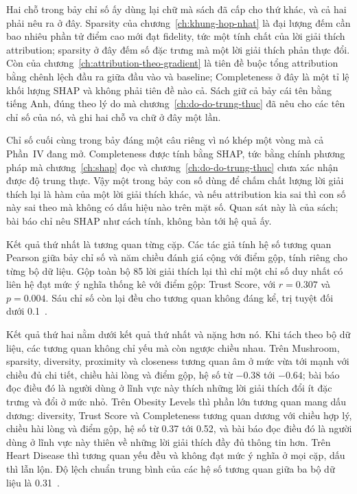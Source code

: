 Hai chỗ trong bảy chỉ số ấy dùng lại chữ mà sách đã cấp cho thứ khác, và cả
hai phải nêu ra ở đây. Sparsity của chương~\ref{ch:khung-hop-nhat} là đại
lượng đếm cần bao nhiêu phần tử điểm cao mới đạt fidelity, tức một tính chất
của lời giải thích attribution; sparsity ở đây đếm số đặc trưng mà một lời
giải thích phản thực đổi. Còn  của
chương~\ref{ch:attribution-theo-gradient} là tiên đề buộc tổng attribution
bằng chênh lệch đầu ra giữa đầu vào và baseline; Completeness ở đây là một tỉ
lệ khối lượng SHAP và không phải tiên đề nào cả. Sách giữ cả bảy cái tên bằng
tiếng Anh, đúng theo lý do mà chương~\ref{ch:do-do-trung-thuc} đã nêu cho các
tên chỉ số của nó, và ghi hai chỗ va chữ ở đây một lần.

%
Chỉ số cuối cùng trong bảy đáng một câu riêng vì nó khép một vòng mà cả
Phần~IV đang mở. Completeness được tính bằng SHAP, tức bằng chính phương pháp
mà chương~\ref{ch:shap} đọc và chương~\ref{ch:do-do-trung-thuc} chưa xác nhận
được độ trung thực. Vậy một trong bảy con số dùng để chấm chất lượng lời giải
thích lại là hàm của một lời giải thích khác, và nếu attribution kia sai thì
con số này sai theo mà không có dấu hiệu nào trên mặt số. Quan sát này là của
sách; bài báo chỉ nêu SHAP như cách tính, không bàn tới hệ quả ấy.

%
Kết quả thứ nhất là tương quan từng cặp. Các tác giả tính hệ số tương quan
Pearson giữa bảy chỉ số và năm chiều đánh giá cộng với điểm gộp, tính riêng
cho từng bộ dữ liệu. Gộp toàn bộ 85 lời giải thích lại thì chỉ một chỉ số duy
nhất có liên hệ đạt mức ý nghĩa thống kê với điểm gộp: Trust Score, với
$r = 0.307$ và $p = 0.004$. Sáu chỉ số còn lại đều cho tương quan không đáng
kể, trị tuyệt đối dưới 0.1~\autocite{p25userperception}.

Kết quả thứ hai nằm dưới kết quả thứ nhất và nặng hơn nó. Khi tách theo bộ dữ
liệu, các tương quan không chỉ yếu mà còn ngược chiều nhau. Trên Mushroom,
sparsity, diversity, proximity và closeness tương quan âm ở mức vừa tới mạnh
với chiều đủ chi tiết, chiều hài lòng và điểm gộp, hệ số từ $-0.38$ tới
$-0.64$; bài báo đọc điều đó là người dùng ở lĩnh vực này thích những lời giải
thích đổi ít đặc trưng và đổi ở mức nhỏ. Trên Obesity Levels thì phần lớn tương quan mang
dấu dương: diversity, Trust Score và Completeness tương quan dương với chiều
hợp lý, chiều hài lòng và điểm gộp, hệ số từ 0.37 tới 0.52, và bài báo đọc
điều đó là người dùng ở lĩnh vực này thiên về những lời giải thích đầy đủ
thông tin hơn. Trên Heart Disease thì tương quan yếu đều và không đạt mức ý
nghĩa ở mọi cặp, dấu thì lẫn lộn. Độ lệch chuẩn trung bình của các hệ số tương
quan giữa ba bộ dữ liệu là 0.31~\autocite{p25userperception}.

